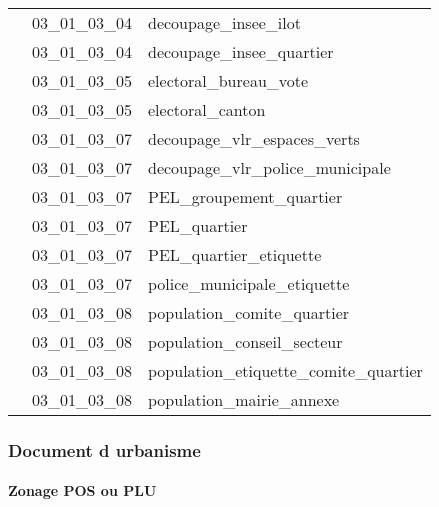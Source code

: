 \documentclass[12pt,titlepage]{book}
\begin{document}
\begin{supertabular}{|p{10cm}|c|p{15cm}|}
                    & 03\_01\_03\_04 & decoupage\_insee\_ilot\\


                    & 03\_01\_03\_04 & decoupage\_insee\_quartier\\


                    & 03\_01\_03\_05 & electoral\_bureau\_vote\\


                    & 03\_01\_03\_05 & electoral\_canton\\


                    & 03\_01\_03\_07 & decoupage\_vlr\_espaces\_verts\\


                    & 03\_01\_03\_07 & decoupage\_vlr\_police\_municipale\\


                    & 03\_01\_03\_07 & PEL\_groupement\_quartier\\


                    & 03\_01\_03\_07 & PEL\_quartier\\


                    & 03\_01\_03\_07 & PEL\_quartier\_etiquette\\


                    & 03\_01\_03\_07 & police\_municipale\_etiquette\\


                    & 03\_01\_03\_08 & population\_comite\_quartier\\


                    & 03\_01\_03\_08 & population\_conseil\_secteur\\


                    & 03\_01\_03\_08 & population\_etiquette\_comite\_quartier\\


                    & 03\_01\_03\_08 & population\_mairie\_annexe\\
\hline
\end{supertabular}

\subsubsection{\large Document d urbanisme}
\paragraph{Zonage POS ou PLU}
\noindent
\vspace{\baselineskip}
\end{document}
